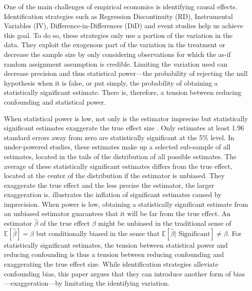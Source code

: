 			One of the main challenges of empirical economics is identifying causal effects. Identification strategies such as Regression Discontinuity (RD), Instrumental Variables (IV), Difference-in-Differences (DiD) and event studies help us achieve this goal. To do so, these strategies only use a portion of the variation in the data. They exploit the exogenous part of the variation in the treatment or decrease the sample size by only considering observations for which the as-if random assignment assumption is credible. Limiting the variation used can decrease precision and thus statistical power---the probability of rejecting the null hypothesis when it is false, or put simply, the probability of obtaining a statistically significant estimate. There is, therefore, a tension between reducing confounding and statistical power. 
			
			When statistical power is low, not only is the estimator imprecise but statistically significant estimates exaggerate the true effect size \citep{gelmanType2000, ioannidis_why_2008, gelman_beyond_2014}. Only estimates at least 1.96 standard errors away from zero are statistically significant at the 5\% level. In under-powered studies, these estimates make up a selected sub-sample of all estimates, located in the tails of the distribution of all possible estimates. The average of these statistically significant estimates differs from the true effect, located at the center of the distribution if the estimator is unbiased. They exaggerate the true effect and the less precise the estimator, the larger exaggeration is.   illustrates the inflation of significant estimates caused by imprecision. When power is low, obtaining a statistically significant estimate from an unbiased estimator guarantees that it will be far from the true effect. An estimator $\hat{\beta}$ of the true effect $\beta$ might be unbiased in the traditional sense of $\mathbb{E}[\hat{\beta}] = \beta$ but conditionally biased in the sense that $\mathbb{E}[\hat{\beta} | \text{ Significant}] \neq \beta$. For statistically significant estimates, the tension between statistical power and reducing confounding is thus a tension between reducing confounding and exaggerating the true effect size. While identification strategies alleviate confounding bias, this paper argues that they can introduce another form of bias---exaggeration---by limitating the identifying variation.
			
